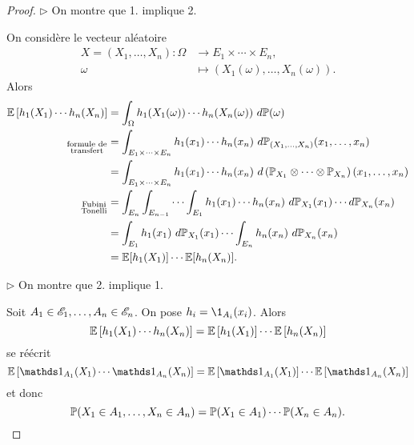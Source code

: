 \begin{proof}
    \(\triangleright\) On montre que 1. implique 2. 

    On considère le vecteur aléatoire 
    \begin{equation*}
        \begin{aligned}
            X = (X_1,\ldots,X_n): \Omega &\to E_1\times\cdots\times E_n,\\
            \omega &\mapsto (X_1(\omega),\ldots,X_n(\omega)).
        \end{aligned}
    \end{equation*}
    Alors
    \begin{equation*}
        \begin{aligned}
            \mathbb{E}\left[ h_1(X_1)\cdots h_n(X_n) \right]
            &= \int_{\Omega} h_1(X_1(\omega))\cdots h_n(X_n(\omega))\,\mathop{}\!{d} \mathbb{P}(\omega)\\
            {}_{\substack{\text{formule de}\\\text{transfert}}}
            &= \int_{E_1\times\cdots\times E_n} h_1(x_1)\cdots h_n(x_n)\,\mathop{}\!{d} \mathbb{P}_{(X_1,\ldots,X_n)}(x_1,\ldots,x_n)\\
            &= \int_{E_1\times\cdots\times E_n} h_1(x_1)\cdots h_n(x_n)\,\mathop{}\!{d} \left( \mathbb{P}_{X_1}\otimes\cdots\otimes\mathbb{P}_{X_n} \right)(x_1,\ldots,x_n)\\
            {}_{\substack{\text{Fubini}\\\text{Tonelli}}}
            &= \int_{E_n} \int_{E_{n-1}}\cdots \int_{E_1} h_1(x_1)\cdots h_n(x_n)\,\mathop{}\!{d} \mathbb{P}_{X_1}(x_1)\cdots \mathop{}\!{d} \mathbb{P}_{X_n}(x_n)\\
            &= \int_{E_1} h_1(x_1)\,\mathop{}\!{d} \mathbb{P}_{X_1}(x_1)\cdots \int_{E_n} h_n(x_n)\,\mathop{}\!{d} \mathbb{P}_{X_n}(x_n)\\
            &= \mathbb{E}[h_1(X_1)]\cdots \mathbb{E}[h_n(X_n)].
        \end{aligned}
    \end{equation*}

    \(\triangleright\) On montre que 2. implique 1.

    Soit \(A_1\in\mathscr{E}_1,\ldots,A_n\in\mathscr{E}_n\). On pose \(h_i = \1_{A_i}(x_i)\).
    Alors
    \begin{equation*}
        \mathbb{E}\left[ h_1(X_1)\cdots h_n(X_n) \right] = \mathbb{E}\left[ h_1(X_1)\right]\cdots \mathbb{E}\left[ h_n(X_n) \right]
    \end{equation*}
    se réécrit
    \begin{equation*}
        \bb E\left[ \one_{A_1}(X_1)\cdots \one_{A_n}(X_n) \right] = \bb E\left[ \one_{A_1}(X_1) \right]\cdots \bb E\left[ \one_{A_n}(X_n) \right]
    \end{equation*}
    et donc
    \begin{equation*}
        \mathbb{P}(X_1\in A_1,\ldots,X_n\in A_n) = \mathbb{P}(X_1\in A_1)\cdots \mathbb{P}(X_n\in A_n).
    \end{equation*}
\end{proof}

